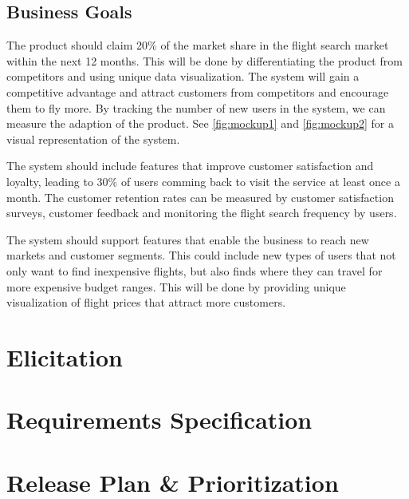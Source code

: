 \documentclass[a4paper]{article}
\begin{document}
\subsection{Business Goals}
The product should claim 20\% of the market share in the flight search market within the next 12 months. This will be done by differentiating the product from competitors and using unique data visualization. The system will gain a competitive advantage and attract customers from competitors and encourage them to fly more. By tracking the number of new users in the system, we can measure the adaption of the product.
See \autoref{fig:mockup1} and \autoref{fig:mockup2} for a visual representation of the system.


The system should include features that improve customer satisfaction and loyalty, leading to 30\% of users comming back to visit the service at least once a month. The customer retention rates can be measured by customer satisfaction surveys, customer feedback and monitoring the flight search frequency by users.  

The system should support features that enable the business to reach new markets and customer segments. This could include new types of users that not only want to find inexpensive flights, but also finds where they can travel for more expensive budget ranges. This will be done by providing unique visualization of flight prices that attract more customers.


\section{Elicitation}


\newpage
\section{Requirements Specification}



\section{Release Plan \& Prioritization}


\end{document}
